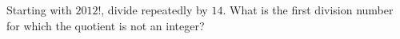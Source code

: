 Starting with $2012!$, divide repeatedly by $14$. What is the first division number for which the quotient is not an integer?
